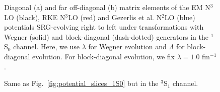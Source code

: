 \documentclass[preprintnumbers,floatfix,aps,prc,preprint,nofootinbib]{revtex4-1}
\begin{document}
\begin{figure}[H]
	\centering
	
	\caption{Diagonal (a) and far off-diagonal (b) matrix elements of the EM N$^3$LO (black), RKE N$^3$LO (red) and Gezerlis et al. N$^2$LO (blue) potentials SRG-evolving right to left under transformations with Wegner (solid) and block-diagonal (dash-dotted) generators in the $^1$S$_0$ channel. Here, we use $\lambda$ for Wegner evolution and $\Lambda$ for block-diagonal evolution. For block-diagonal evolution, we fix $\lambda=1.0$ fm$^{-1}$.}
	\label{potential_slices_1S0}
\end{figure}
%
\begin{figure}[H]
	\centering
	
	\caption{Same as Fig.~\ref{fig:potential_slices_1S0} but in the $^3$S$_1$ channel.}
	\label{potential_slices_3S1}
\end{figure}
\end{document}
